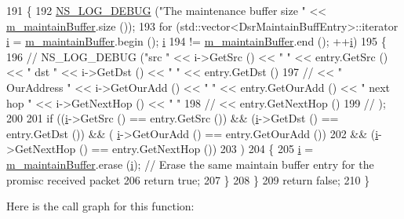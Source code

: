 \begin{DoxyCode}
191 \{
192   \hyperlink{group__logging_ga413f1886406d49f59a6a0a89b77b4d0a}{NS\_LOG\_DEBUG} (\textcolor{stringliteral}{"The maintenance buffer size "} << \hyperlink{classns3_1_1dsr_1_1DsrMaintainBuffer_a942fc86793c5a6f538a9f0bd69709ce9}{m\_maintainBuffer}.size ());
193   \textcolor{keywordflow}{for} (std::vector<DsrMaintainBuffEntry>::iterator \hyperlink{bernuolliDistribution_8m_a6f6ccfcf58b31cb6412107d9d5281426}{i} = \hyperlink{classns3_1_1dsr_1_1DsrMaintainBuffer_a942fc86793c5a6f538a9f0bd69709ce9}{m\_maintainBuffer}.begin (); 
      \hyperlink{bernuolliDistribution_8m_a6f6ccfcf58b31cb6412107d9d5281426}{i}
194        != \hyperlink{classns3_1_1dsr_1_1DsrMaintainBuffer_a942fc86793c5a6f538a9f0bd69709ce9}{m\_maintainBuffer}.end (); ++\hyperlink{bernuolliDistribution_8m_a6f6ccfcf58b31cb6412107d9d5281426}{i})
195     \{
196 \textcolor{comment}{//      NS\_LOG\_DEBUG ("src " << i->GetSrc () << " " << entry.GetSrc () << " dst " << i->GetDst () << " " <<
       entry.GetDst ()}
197 \textcolor{comment}{//                           << " OurAddress " << i->GetOurAdd () << " " << entry.GetOurAdd () << " next
       hop " << i->GetNextHop () << " "}
198 \textcolor{comment}{//                           << entry.GetNextHop ()}
199 \textcolor{comment}{//                    );}
200 
201       \textcolor{keywordflow}{if} ((\hyperlink{bernuolliDistribution_8m_a6f6ccfcf58b31cb6412107d9d5281426}{i}->GetSrc () == entry.GetSrc ()) && (\hyperlink{bernuolliDistribution_8m_a6f6ccfcf58b31cb6412107d9d5281426}{i}->GetDst () == entry.GetDst ()) && (
      \hyperlink{bernuolliDistribution_8m_a6f6ccfcf58b31cb6412107d9d5281426}{i}->GetOurAdd () == entry.GetOurAdd ())
202           && (\hyperlink{bernuolliDistribution_8m_a6f6ccfcf58b31cb6412107d9d5281426}{i}->GetNextHop () == entry.GetNextHop ())
203           )
204         \{
205           \hyperlink{bernuolliDistribution_8m_a6f6ccfcf58b31cb6412107d9d5281426}{i} = \hyperlink{classns3_1_1dsr_1_1DsrMaintainBuffer_a942fc86793c5a6f538a9f0bd69709ce9}{m\_maintainBuffer}.erase (\hyperlink{bernuolliDistribution_8m_a6f6ccfcf58b31cb6412107d9d5281426}{i});   \textcolor{comment}{// Erase the same maintain buffer entry for
       the promisc received packet}
206           \textcolor{keywordflow}{return} \textcolor{keyword}{true};
207         \}
208     \}
209   \textcolor{keywordflow}{return} \textcolor{keyword}{false};
210 \}
\end{DoxyCode}


Here is the call graph for this function\+:





